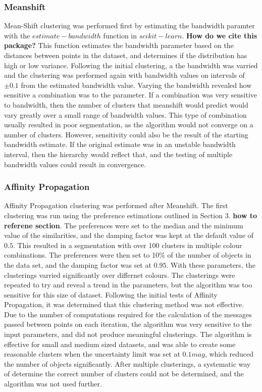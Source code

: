 \subsubsection{Meanshift}
Mean-Shift clustering was performed first by estimating the bandwidth paramter with the $estimate-bandwidth$ function in $scikit-learn$. \textbf{How do we cite this package?}
This function estimates the bandwidth parameter based on the distances between points in the dataset, and determines if the distribution has high or low variance.
Following the initial clustering, a the bandwidth was varried and the clustering was performed again with bandwidth values on intervals of $\pm 0.1$ from the estimated bandwidth value.
Varying the bandwidth revealed how sensitive a combination was to the parameter.
If a combination was very sensitive to bandwidth, then the number of clusters that meanshift would predict would vary greatly over a small range of bandwidth values.
This type of combination usually resulted in poor segmentation, as the algorithm would not converge on a number of clusters. 
However, sensitivity could also be the result of the starting bandwidth estimate.
If the original estimate was in an unstable bandwidth interval, then the hierarchy would reflect that, and the testing of multiple bandwidth values could result in convergence.

\subsubsection{Affinity Propagation}
Affinity Propagation clustering was performed after Meanshift. 
The first clustering was run using the preference estimations outlined in Section 3. \textbf{how to referene section}.
The preferences were set to the median and the minimum value of the similarities, and the damping factor was kept at the default value of $0.5$.
This resulted in a segmentation with over 100 clusters in multiple colour combinations.
The preferences were then set to 10\% of the number of objects in the data set, and the damping factor was set at $0.95$.
With these parameters, the clusterings varried significantly over differnet colours. 
The clusterings were repeated to try and reveal a trend in the parameters, but the algorithm was too sensitive for this size of dataset.
Following the initial tests of Affinity Propagation, it was determined that this clustering method was not effective.
Due to the number of computations required for the calculation of the messages passed between points on each iteration, the algorithm was very sensitive to the input parameters, and did not produce meaningful clusterings.
The algorithm is effective for small and medium sized datasets, and was able to create some reasonable clusters when the uncertainty limit was set at $0.1 mag$, which reduced the number of objects significantly. 
After multiple clusterings, a systematic way of determine the correct number of clusters could not be determined, and the algorithm was not used further.

